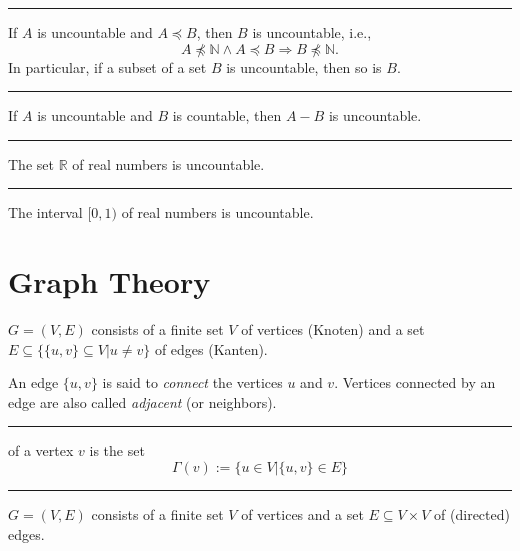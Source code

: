 \documentclass[a4paper]{extarticle}
\newcommand{\Proof}{\textbf{Proof.}\ }
\newcommand{\N}{\mathbb{N}}
\newcommand{\R}{\mathbb{R}}
\newcommand{\sep}{\vspace{5pt}\noindent\hrule\vspace{5pt}}
\begin{document}
\begin{multicols*}{2}
\sep

\Lem If $A$ is uncountable and $A\preceq B$, then $B$ is uncountable,
i.e.,
\[
A\not\preceq \N \land A\preceq B \Longrightarrow B\not\preceq \N.
\]
In particular, if a subset of a set $B$ is uncountable, then so is $B$.

\sep

\Lem If $A$ is uncountable and $B$ is countable, then $A-B$ is
uncountable.

\sep

\Thm The set $\R$ of real numbers is uncountable.

\sep

\Thm The interval $[0,1)$ of real numbers is uncountable.


\section{Graph Theory}

 $G=(V,E)$ consists of a finite set $V$ of vertices (Knoten)
and a set $E\subseteq \{\{u,v\}\subseteq V | u \neq v\}$ of edges (Kanten).

An edge $\{u,v\}$ is said to \emph{connect} the vertices $u$ and $v$. Vertices
connected by an edge are also called \emph{adjacent} (or neighbors).

\sep

\Def[Neighborhood] of a vertex $v$ is the set
\[
\Gamma (v) := \{u\in V | \{u,v\} \in E \}
\] 

\sep

 $G=(V,E)$ consists of a finite set $V$ of
vertices and a set $E \subseteq V \times V$ of (directed) edges. 


\end{multicols*}
\end{document}
